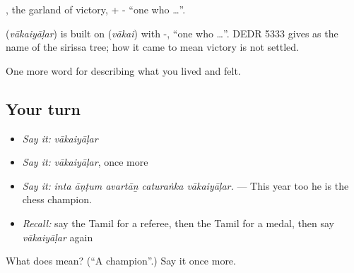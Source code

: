 , the garland of victory, + - \textquotedblleft{}one who …\textquotedblright{}.

\begin{cousinweb}
\textbf{} (\emph{vākaiyāḷar}) is built on  (\emph{vākai}) with -, \textquotedblleft{}one who …\textquotedblright{}. DEDR 5333 gives  as the name of the sirissa tree; how it came to mean victory is not settled.
\end{cousinweb}

\begin{grammarlens}[title={What you've built}]
One more word for describing what you lived and felt.
\end{grammarlens}

\subsection*{Your turn}
\begin{itemize}
\raggedright
  \item \emph{Say it:} \emph{vākaiyāḷar}
  \item \emph{Say it:} \emph{vākaiyāḷar}, once more
  \item \emph{Say it:} \emph{inta āṇṭum avartāṉ caturaṅka vākaiyāḷar.} — This year too he is the chess champion.
  \item \emph{Recall:} say the Tamil for a referee, then the Tamil for a medal, then say \emph{vākaiyāḷar} again
\end{itemize}

\begin{tcolorbox}[breakable,colback=teal!4,colframe=teal!35!black,title={Before you move on}]
What does  mean? (\textquotedblleft{}A champion\textquotedblright{}.) Say it once more.
\end{tcolorbox}
